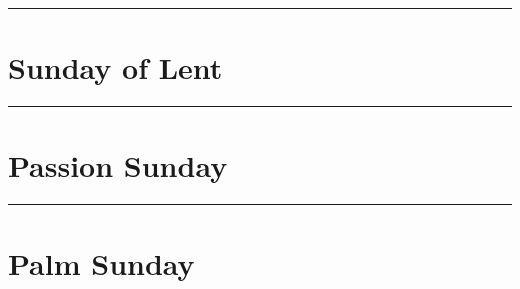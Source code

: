 {{\medskip
\hrule
{
\label{annunciation-commem}

\bigskip
\benedicamusdomino{}
}

\def\commemorations{If today is March 18 or 19, the First Vespers of St Joseph is commemorated as on page \pageref{stjoseph-commem}.  If today is March 24 or 25, the First Vespers of the Annunciation is commemorated as on page \pageref{annunciation-commem}.}
{
\section{ Sunday of Lent}
\printcommonvespers[1]

\printcommemnote{}
}

\medskip
\hrule
{
\let\printhymnnote=\undefined
\section{Passion Sunday}
\printcommonvespers[1]
\def\vrlabel{vr-eripeme}
\def\hymninput{\gabcfolder/inc-hymn-VexillaRegis}

\printcommemnote{}
}

\medskip
\hrule
{
\section{Palm Sunday}
\printcommonvespers[1]

\bigskip
\benedicamusdomino{}
}

}
}